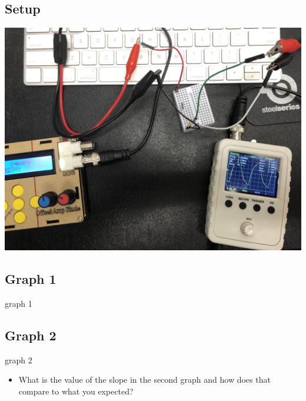 \documentclass{article}
\begin{document}
\begin{center}
  \subsection*{Setup}
  \includegraphics[scale=0.066]{setup1.jpeg}
\end{center}
\begin{center}
  \subsection*{Graph 1}
  graph 1
  \subsection*{Graph 2}
  graph 2
\end{center}
\begin{itemize}
  \item What is the value of the slope in the second graph and how does that compare to what you expected?
\end{itemize}
\end{document}
